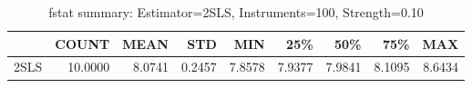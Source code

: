 \begin{table}[ht]
\centering
\caption{fstat summary: Estimator=2SLS, Instruments=100, Strength=0.10}
\begin{tabular}{lrrrrrrrr}
\toprule
 & COUNT & MEAN & STD & MIN & 25\% & 50\% & 75\% & MAX \\
\midrule
2SLS & 10.0000 & 8.0741 & 0.2457 & 7.8578 & 7.9377 & 7.9841 & 8.1095 & 8.6434 \\
\bottomrule
\end{tabular}
\end{table}
